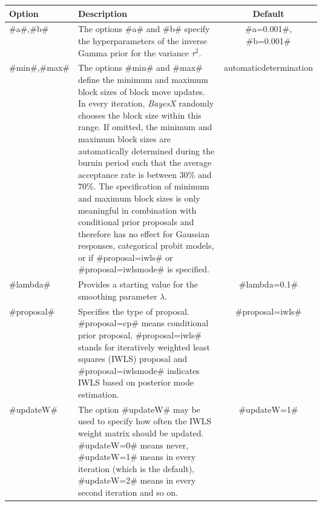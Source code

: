 \begin{table}[ht] \footnotesize \centering
\begin{tabular}{|l|p{0.6\linewidth}|c|}

\hline Option & Description & Default\\ \hline\hline

#a#,#b# & The options #a# and #b# specify the hyperparameters of
the inverse Gamma prior for
the variance $\tau^2$. & #a=0.001#, #b=0.001# \\
\hline

#min#,#max# & The options #min# and #max# define the minimum and
maximum block sizes of block move updates. In every iteration,
{\em BayesX} randomly chooses the block size within this range. If
omitted, the minimum and maximum block sizes are automatically
determined during the burnin period such that the average
acceptance rate is between 30\% and 70\%. The specification of
minimum and maximum block sizes is only meaningful in combination
with conditional prior proposals and therefore has no effect for
Gaussian responses, categorical probit models,
 or if #proposal=iwls# or #proposal=iwlsmode# is specified. & automatic\newline determination \\
\hline

#lambda# & Provides a starting value for the smoothing parameter $\lambda$. & #lambda=0.1# \\
\hline

#proposal# & Specifies the type of proposal. #proposal=cp# means
conditional prior proposal, #proposal=iwls# stands for iteratively
weighted least squares (IWLS)
 proposal and #proposal=iwlsmode# indicates IWLS based on posterior mode estimation. &
#proposal=iwls# \\ \hline

#updateW# & The option #updateW# may be used to specify how often
the IWLS weight matrix should be updated. #updateW=0# means never,
#updateW=1# means in every iteration (which is the default),
#updateW=2# means in every second iteration and so on. &
#updateW=1#
\\ \hline



\end{tabular}
\end{table}
